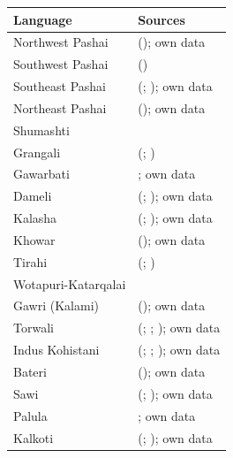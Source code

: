 \documentclass[output=collectionpaper]{langsci/langscibook}
\begin{document}

\begin{table}[p]
\begin{tabularx}{\textwidth}{l>{\raggedright\let\newline\\\arraybackslash\hspace{0pt}}X}
\lsptoprule

Language & Sources \\
\midrule
Northwest Pashai & (\citealt[143--203]{Morgenstierne1967}); own data \\
Southwest Pashai & (\citealt[45--142]{Morgenstierne1967}) \\
Southeast Pashai & (\citealt[251--297]{Morgenstierne1967}; \citealt{Lehr2014}); own data \\
Northeast Pashai & (\citealt[205--249]{Morgenstierne1967}); own data \\
Shumashti & \citep{Morgenstierne1945} \\
Grangali & (\citealt[837--839]{Bashir2003}; \citealt{Grjunberg1971}) \\
Gawarbati & \citep{Morgenstierne1950}; own data \\
Dameli & (\citealt{Morgenstierne1942}; \citealt{Perder2013}); own data \\
Kalasha & (\citealt[35--49]{HeegardPetersen2015}; \citealt{Bashir1988}); own data \\
Khowar & (\citealt[844--849]{Bashir2003}); own data \\
Tirahi & (\citealt{Morgenstierne1934a}; \citealt[265--327]{Grierson1927}) \\
Wotapuri-Katarqalai & \citep{Buddruss1960} \\
Gawri (Kalami) & (\citealt{Baart1997,Baart1999}); own data \\
Torwali & (\citealt{Lunsford2001}; \citealt[864--869]{Bashir2003}; \citealt{Grierson1929}); own data \\
Indus Kohistani & (\citealt{Hallberg1999}; \citealt[874--877]{Bashir2003}; \citealt{Lubberger2014}); own data \\
Bateri & (\citealt[207--225, 249--251]{Hallberg1992}); own data \\
Sawi & (\citealt{Buddruss1967}; \citealt[43--48]{Liljegren2009}); own data \\
Palula & \citep{Liljegren2016}; own data \\
Kalkoti & (\citealt[43--48]{Liljegren2009}; \citealt{Liljegren2013}); own data \\

\end{tabularx}
\end{table}
\end{document}
